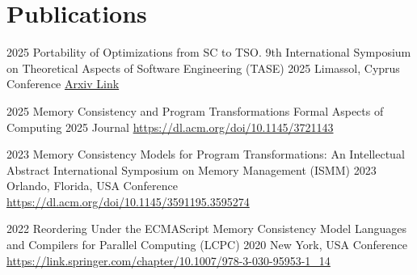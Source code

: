 
\section{Publications}

\cventry
{2025}
{Portability of Optimizations from SC to TSO.}
{9th International Symposium on Theoretical Aspects of Software Engineering (TASE) 2025}
{Limassol, Cyprus}
{Conference}
{\href{https://arxiv.org/abs/2504.17646}{Arxiv Link}}

\cventry
{2025}
{Memory Consistency and Program Transformations}
{Formal Aspects of Computing 2025}
{}
{Journal}
{\url{https://dl.acm.org/doi/10.1145/3721143}}

\cventry
{2023}
{Memory Consistency Models for Program Transformations: An Intellectual Abstract}
{International Symposium on Memory Management (ISMM) 2023}
{Orlando, Florida, USA}
{Conference}
{\url{https://dl.acm.org/doi/10.1145/3591195.3595274}}

\cventry
{2022}
{Reordering Under the ECMAScript Memory Consistency Model}
{Languages and Compilers for Parallel Computing (LCPC) 2020}
{New York, USA}
{Conference}
{\url{https://link.springer.com/chapter/10.1007/978-3-030-95953-1_14}}


